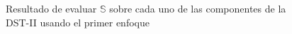 \begin{figure}
\begin{multicols}{2}
    \end{multicols}
\begin{multicols}{2}
	\par
	\par
\end{multicols}
\caption{Resultado de evaluar $\mathbb{S}$ sobre cada uno de las componentes de la DST-II usando el primer enfoque} \label{fig:gaussian-example-approach1}
\end{figure}


